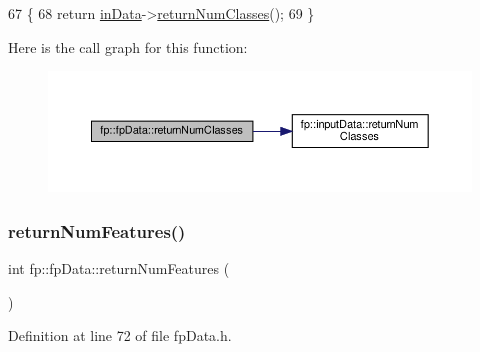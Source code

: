 \begin{DoxyCode}
67                                          \{
68                 \textcolor{keywordflow}{return} \hyperlink{classfp_1_1fpData_a49d7c3f58bcf88843c25b1b0c9714ebe}{inData}->\hyperlink{classfp_1_1inputData_a1e775e3744cb3bacb1a6776054aabe4f}{returnNumClasses}();
69             \}
\end{DoxyCode}
Here is the call graph for this function\+:
\nopagebreak
\begin{figure}[H]
\begin{center}
\leavevmode
\includegraphics[width=350pt]{classfp_1_1fpData_a7abfc93af30b7262d59b6d304796a09d_cgraph}
\end{center}
\end{figure}
\mbox{\label{classfp_1_1fpData_a95088e33b280e5c82b3543033d8852e1}} 
\subsubsection{\texorpdfstring{return\+Num\+Features()}{returnNumFeatures()}}
{\footnotesize\ttfamily int fp\+::fp\+Data\+::return\+Num\+Features (\begin{DoxyParamCaption}{ }\end{DoxyParamCaption})\hspace{0.3cm}{\ttfamily [inline]}}



Definition at line 72 of file fp\+Data.\+h.


